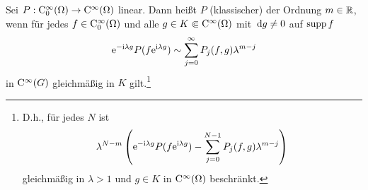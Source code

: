 \begin{df}
Sei $P:\mathrm C_0^\infty(\Omega)\to\mathrm C^\infty(\Omega)$  linear. Dann heißt $P$ (klassischer)  der Ordnung $m\in\mathbb R$, wenn für jedes $f\in\mathrm C_0^\infty(\Omega)$ und alle $g\in K\Subset \mathrm C^\infty(\Omega)$ mit $\,\mathrm d g\ne0$ auf $\operatorname{supp} f$
\begin{equation}
    \mathrm e^{-\mathrm i\lambda g} P(f\mathrm e^{\mathrm i\lambda g}) \sim \sum_{j=0}^\infty P_j(f,g) \lambda^{m-j}
\end{equation}
in $\mathrm C^\infty(G)$ gleichmäßig in $K$  gilt.\footnote{D.h., für jedes $N$ ist
\begin{equation}\label{eq:6:6.7}
   \lambda^{N-m} \left( \mathrm e^{-\mathrm i\lambda g} P(f\mathrm e^{\mathrm i\lambda g}) - \sum_{j=0}^{N-1} P_j(f,g) \lambda^{m-j}\right)
\end{equation}
gleichmäßig in $\lambda>1$ und $g\in K$ in $\mathrm C^\infty(\Omega)$ beschränkt.} 
\end{df}

